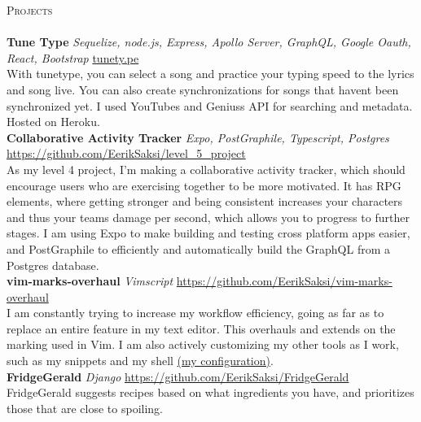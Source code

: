 \documentclass[a4paper]{article}
\newcommand{\lineunder} {
    \vspace*{-8pt} \\
    \hspace*{-18pt} \hrulefill \\
}
\newcommand{\header} [1] {
    {\hspace*{-18pt}\vspace*{6pt} \textsc{#1}}
    \vspace*{-6pt} \lineunder
}
\begin{document}
\header{Projects}
    {\textbf{Tune Type}} {\sl Sequelize, node.js, Express, Apollo Server, GraphQL, Google Oauth, React, Bootstrap} \hfill \url{tunety.pe}\\
With tunetype, you can select a song and practice your typing speed to the lyrics and song live. You can also create synchronizations for songs that haven\textquotesingle{}t been synchronized yet. I used YouTube\textquotesingle{}s and Genius\textquotesingle{}s API for searching and metadata. Hosted on Heroku.\\
\vspace*{2mm}
    {\textbf{Collaborative Activity Tracker}} {\sl Expo, PostGraphile, Typescript, Postgres} \hfill \url{https://github.com/EerikSaksi/level_5_project}\\
As my level 4 project, I'm making a collaborative activity tracker, which should encourage users who are exercising together to be more motivated. It has RPG elements, where getting stronger and being consistent increases your characters and thus your teams damage per second, which allows you to progress to further stages. I am using Expo to make building and testing cross platform apps easier, and PostGraphile to efficiently and automatically build the GraphQL from a Postgres database.\\
\vspace*{2mm}
    {\textbf{vim-marks-overhaul}} {\sl Vimscript} \hfill \url{https://github.com/EerikSaksi/vim-marks-overhaul}\\
I am constantly trying to increase my workflow efficiency, going as far as to replace an entire feature in my text editor. This overhauls and extends on the marking used in Vim. I am also actively customizing my other tools as I work, such as my snippets and my shell \href{https://github.com/EerikSaksi/dotfiles}{(my configuration)}.   \\
\vspace*{2mm}
    {\textbf{FridgeGerald}} {\sl Django} \hfill \url{https://github.com/EerikSaksi/FridgeGerald}\\
FridgeGerald suggests recipes based on what ingredients you have, and prioritizes those that are close to spoiling.\\
\vspace*{2mm}

\ 
\end{document}
